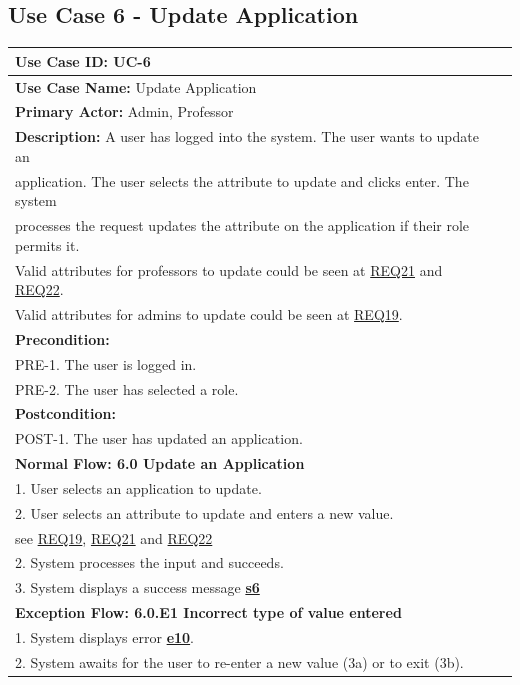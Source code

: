 \documentclass[fontsize=12pt,paper=letter,twoside]{scrartcl}
\begin{document}
\clearpage
\newpage
\subsection{Use Case 6 - Update Application} \label{subsec:uc6}

\begin{table}[!htb]
\begin{center}
\begin{tabular}{|l|l|}
\hline
\textbf{Use Case ID:} UC-6 \\ \hline
\textbf{Use Case Name:} Update Application \\ \hline
\textbf {Primary Actor:} Admin, Professor \\ \hline
\textbf{Description:} A user has logged into the system. The user wants to update an \\application. The user selects the attribute to update and clicks enter. The system \\processes the request updates the attribute on the application if their role permits it.
\\Valid attributes for professors to update could be seen at \hyperref[R21]{REQ21} and \hyperref[R22]{REQ22}.
\\Valid attributes for admins to update could be seen at \hyperref[R19]{REQ19}. \\ \hline
\textbf{Precondition:}
\\ PRE-1. The user is logged in.
\\ PRE-2. The user has selected a role.\\ \hline
\textbf{Postcondition:}
\\ POST-1. The user has updated an application. \\ \hline
\textbf{Normal Flow: 6.0 Update an Application}
\\ 1. User selects an application to update.
\\ 2. User selects an attribute to update and enters a new value.\\see  \hyperref[R19]{REQ19}, \hyperref[R21]{REQ21} and \hyperref[R22]{REQ22}
\\ 2. System processes the input and succeeds.
\\ 3. System displays a success message \hyperref[app:success]{\textbf{s6}}\\ \hline
\textbf{Exception Flow: 6.0.E1 Incorrect type of value entered}
\\ 1. System displays error \hyperref[app:error]{\textbf{e10}}.
\\ 2. System awaits for the user to re-enter a new value (3a) or to exit (3b). \\ \hline

\end{tabular}
\end{center}
\end{table}
\end{document}

